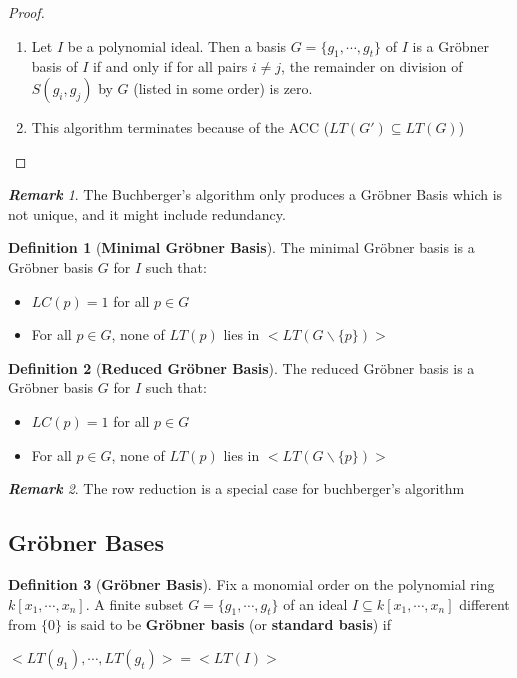 \documentclass{article}
\theoremstyle{definition}
\newtheorem{definition}{Definition}[section]
\theoremstyle{remark}
\newtheorem*{remark}{\textbf{Remark}}
\theoremstyle{example}
\begin{document}
\begin{proof}
\begin{enumerate}
    \item Let $I$ be a polynomial ideal. Then a basis $G = \{g_1, \cdots, g_t\}$ of $I$ is a Gröbner basis of $I$ if and only if for all pairs $i \neq j$, the remainder on division of $S(g_i, g_j)$ by $G$ (listed in some order) is zero.
    \item This algorithm terminates because of the ACC ($LT(G') \subseteq LT(G)$)
\end{enumerate}
\end{proof}

\begin{remark}
    The Buchberger's algorithm only produces a Gröbner Basis which is not unique, and it might include redundancy.
\end{remark}

\begin{definition}[\textbf{Minimal Gröbner Basis}]
    The minimal Gröbner basis is a Gröbner basis  $G$ for $I$ such that:
    \begin{itemize}
        \item $LC(p) = 1$ for all $p \in G$
        \item For all $p \in G$, none of $LT(p)$ lies in $<LT(G\backslash\{p\})>$
    \end{itemize}
\end{definition}

\begin{definition}[\textbf{Reduced Gröbner Basis}]
    The reduced Gröbner basis is a Gröbner basis  $G$ for $I$ such that:
    \begin{itemize}
        \item $LC(p) = 1$ for all $p \in G$
        \item For all $p \in G$, none of $LT(p)$ lies in $<LT(G\backslash\{p\})>$
    \end{itemize}
\end{definition}

\begin{remark}
    The row reduction is a special case for buchberger's algorithm
\end{remark}

\subsection{Gröbner Bases}

\begin{definition}[\textbf{Gröbner Basis}]\cite{cox_grobner_2015}\label{def:gb}
    Fix a monomial order on the polynomial ring $k[x_1, \cdots, x_n]$. A finite subset $G = \{g_1, \cdots, g_t\}$ of an ideal $I \subseteq k[x_1, \cdots, x_n]$ different from $\{0\}$ is said to be \textbf{Gröbner basis} (or \textbf{standard basis}) if
    \begin{center}
        $<LT(g_1), \cdots, LT(g_t)> = <LT(I)>$
    \end{center}
\end{definition}
\end{document}
